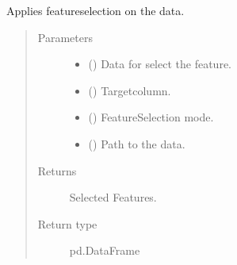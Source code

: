 \documentclass[letterpaper,10pt,english]{sphinxmanual}
\begin{document}

\begin{fulllineitems}
\label{\detokenize{anoog.io:anoog.io.data_io.feature_selection}}
\sphinxAtStartPar
Applies feature\sphinxhyphen{}selection on the data.
\begin{quote}\begin{description}
\item[{Parameters}] \leavevmode\begin{itemize}
\item {} 
\sphinxAtStartPar
{} () \textendash{} Data for select the feature.

\item {} 
\sphinxAtStartPar
{} () \textendash{} Target\sphinxhyphen{}column.

\item {} 
\sphinxAtStartPar
{} ({\hyperref[\detokenize{anoog.io:anoog.io.data_io.selection_mode}]{}}) \textendash{} Feature\sphinxhyphen{}Selection mode.

\item {} 
\sphinxAtStartPar
{} () \textendash{} Path to the data.

\end{itemize}

\item[{Returns}] \leavevmode
\sphinxAtStartPar
Selected Features.

\item[{Return type}] \leavevmode
\sphinxAtStartPar
pd.DataFrame

\end{description}\end{quote}

\end{fulllineitems}
\end{document}
